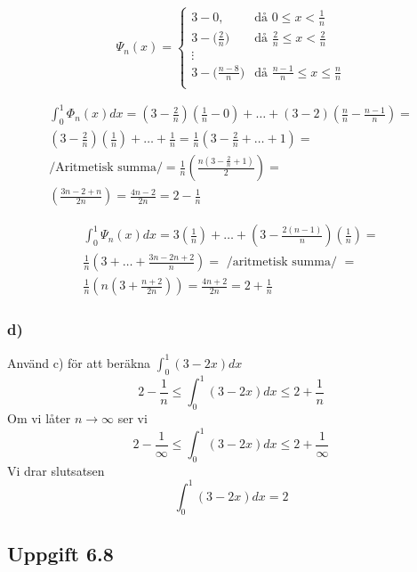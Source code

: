 \documentclass[12pt]{article}
\begin{document}
\[
\Psi_{n}(x)= \begin{cases} 
	3 - 0, & \mbox{då } 0 \leq x < \frac{1}{n}  \\
	3 - \Big(\frac{2}{n}\Big) & \mbox{då } \frac{2}{n}  \leq x < \frac{2}{n}  \\
	\vdots \\
	3 - \Big(\frac{n-8}{n}\Big) & \mbox{då } \frac{n-1}{n}  \leq x \leq \frac{n}{n}  \\
\end{cases}
\]

\[ 
\begin{split}
\int_0^1 \Phi_{n}(x)dx = \left(3- \frac{2}{n}\right)\left( \frac{1}{n} - 0\right)+ \ldots  +
						\left(3- 2\right)\left( \frac{n}{n} - \frac{n-1}{n}\right)=\\						
						\left(3- \frac{2}{n}\right)\left( \frac{1}{n}\right)+ \ldots  +
						 \frac{1}{n}= \frac{1}{n}\left(3-\frac{2}{n}+\ldots+ 1 \right)=\\
						 /\mbox{Aritmetisk summa}/=
						  \frac{1}{n} \left(\frac{n \left(3- \frac{2}{n} +1\right) }{2}\right)=\\
						 \left(\frac{3n - 2 + n}{2n}\right)= \frac{4n-2}{2n} = 2-\frac{1}{n}
\end{split}
\]

\[
\begin{split}
\int_0^1 \Psi_{n}(x)dx = 3\left(\frac{1}{n}\right)+ \ldots  +
						\left(3- \frac{2(n-1)}{n} \right) \left(\frac{1}{n}\right)=\\			
						\frac{1}{n}\left(3 +\ldots + \frac{3n-2n+2}{n}\right)= 
						\mbox{ /aritmetisk summa/ }= \\
						\frac{1}{n} \left(n \left( 3 + \frac{n+2}{2n} \right)\right)= 
						\frac{4n+2}{2n}=2+\frac{1}{n}
						\end{split}
\]


\subsubsection*{d)} Använd c) för att beräkna $ \int_0^1(3-2x)dx $
\[
	2-\frac{1}{n} \leq \int_0^1(3-2x)dx \leq 2 + \frac{1}{n}
\]
Om vi låter $n \rightarrow \infty $ ser vi 
\[
	2-\frac{1}{\infty} \leq \int_0^1(3-2x)dx \leq 2 + \frac{1}{\infty}
\]
Vi drar slutsatsen
\[
	\int_0^1(3-2x)dx = 2
\]
\subsection*{Uppgift 6.8}
\end{document}
